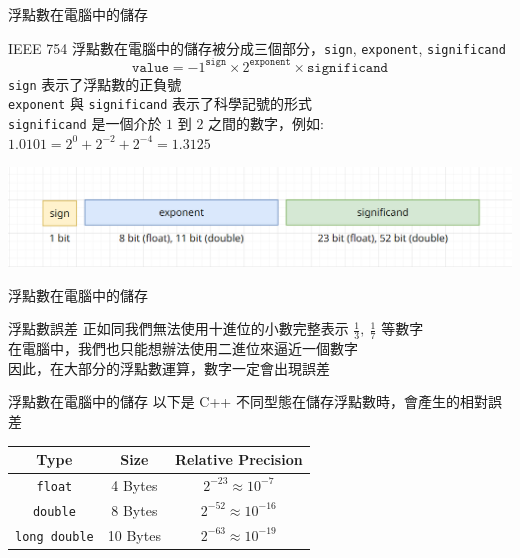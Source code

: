 \documentclass[aspectratio=169]{beamer}
\begin{document}
\begin{frame}[fragile]{浮點數在電腦中的儲存}
    \begin{alertblock}{IEEE 754}
        浮點數在電腦中的儲存被分成三個部分，\texttt{sign}, \texttt{exponent}, \texttt{significand}
        $$\mathtt{value} = -1^{\mathtt{sign}} \times 2^{\mathtt{exponent}} \times \mathtt{significand}$$
        \texttt{sign} 表示了浮點數的正負號 \\
        \vspace{2.5mm}
        \texttt{exponent} 與 \texttt{significand} 表示了科學記號的形式 \\
        \vspace{2.5mm}
        \texttt{significand} 是一個介於 $1$ 到 $2$ 之間的數字，例如: $\mathtt{1.0101} = 2^0 + 2^{-2} + 2^{-4} = 1.3125$
    \end{alertblock}
    \begin{center}
        \includegraphics[scale=0.3]{images/IEEE754.png}
    \end{center}
\end{frame}

\begin{frame}[fragile]{浮點數在電腦中的儲存}
    \begin{alertblock}{浮點數誤差}
        正如同我們無法使用十進位的小數完整表示 $\frac{1}{3}, \ \frac{1}{7}$ 等數字 \\
        \vspace{2.5mm}
        在電腦中，我們也只能想辦法使用二進位來逼近一個數字\\
        \vspace{2.5mm}
        因此，在大部分的浮點數運算，數字一定會出現誤差
    \end{alertblock}
\end{frame}

\begin{frame}[fragile]{浮點數在電腦中的儲存}
    以下是 C++ 不同型態在儲存浮點數時，會產生的相對誤差 \\
    \vspace{2.5mm}
    \begin{center}
        \begin{tabular}{|c|c|c|}
            \hline
            Type & Size &  Relative Precision \\ \hline \hline
            \texttt{float} & 4 Bytes & $2^{-23} \approx 10^{-7}$ \\ \hline 
            \texttt{double} & 8 Bytes & $2^{-52} \approx 10^{-16}$ \\ \hline
            \texttt{long double} & 10 Bytes & $2^{-63} \approx 10^{-19}$ \\ \hline
        \end{tabular}
    \end{center}
\end{frame}
\end{document}
